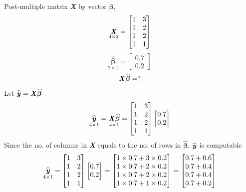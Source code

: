 \documentclass[12pt]{report}
\begin{document}
\justify
Post-multiple matrix \textbf{\textit{X}} by vector $\boldsymbol{\beta}$,
{$$\underset{4\times2}{\textbf{\textit{X}}}
	=
	\begin{bmatrix}
	1 & 3 \\
	1 & 2 \\
	1 & 2 \\
	1 & 1 
	\end{bmatrix}
$$}
{$$\underset{2\times1}{\widehat{\boldsymbol{\beta}}}
	=
	\begin{bmatrix}
	0.7 \\
	0.2 
	\end{bmatrix}
$$}
{$${\textbf{\textit{X}}\widehat{\boldsymbol{\beta}}}
	=
	?
$$}
\justify 
Let $\widehat{\textbf{\textit{y}}}=\textbf{\textit{X}}\widehat{\boldsymbol{\beta}}$
{$$\underset{4\times1}{\widehat{\textbf{\textit{y}}}}
	=
	\underset{4\times1}{\textbf{\textit{X}}\widehat{\boldsymbol{\beta}}}
	=
	\begin{bmatrix}
	1 & 3 \\
	1 & 2 \\
	1 & 2 \\
	1 & 1 
	\end{bmatrix}
	\begin{bmatrix}
	0.7 \\
	0.2 
	\end{bmatrix}
$$}
\justify 
Since the no. of columns in \textbf{\textit{X}} equals to the no. of rows in $\widehat{\boldsymbol{\beta}}$, $\widehat{\textbf{\textit{y}}}$ is computable
{$$\underset{4\times1}{\widehat{\textbf{\textit{y}}}}
	=
	\begin{bmatrix}
	1 & 3 \\
	1 & 2 \\
	1 & 2 \\
	1 & 1 
	\end{bmatrix}
	\begin{bmatrix}
	0.7 \\
	0.2 
	\end{bmatrix}
	=
	\begin{bmatrix}
	1\times0.7+3\times0.2 \\
	1\times0.7+2\times0.2 \\
	1\times0.7+2\times0.2 \\
	1\times0.7+1\times0.2 
	\end{bmatrix}
	=
	\begin{bmatrix}
	0.7+0.6 \\
	0.7+0.4 \\
	0.7+0.4 \\
	0.7+0.2 
	\end{bmatrix}
$$}
\end{document}
